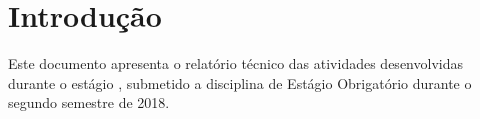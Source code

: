 \chapter[Introdução]{Introdução}

Este documento apresenta o relatório técnico das atividades desenvolvidas durante o estágio , submetido a disciplina de Estágio Obrigatório durante o segundo semestre de 2018.